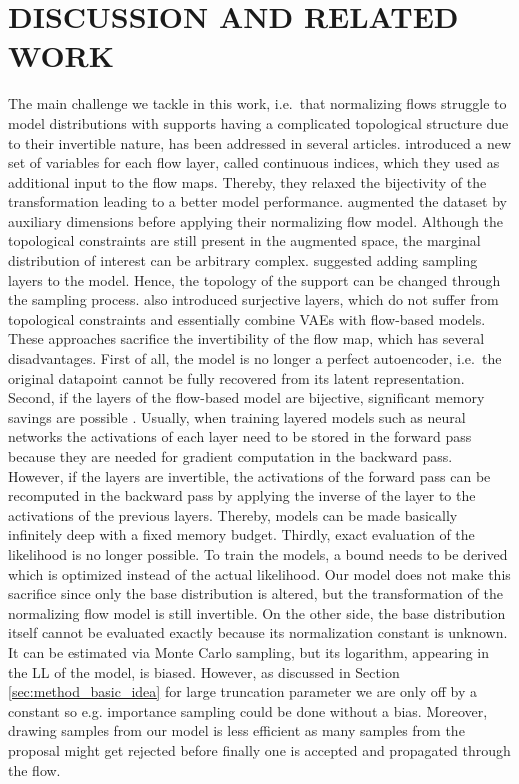\documentclass[twoside]{article}
\begin{document}
\section{DISCUSSION AND RELATED WORK}
\label{sec:discussion}

The main challenge we tackle in this work, i.e.\ that normalizing flows struggle to model distributions with supports having a complicated topological structure due to their invertible nature, has been addressed in several articles. \cite{Cornish2020} introduced a new set of variables for each flow layer, called continuous indices, which they used as additional input to the flow maps. Thereby, they relaxed the bijectivity of the transformation leading to a better model performance. \cite{Huang2020} augmented the dataset by auxiliary dimensions before applying their normalizing flow model. Although the topological constraints are still present in the augmented space, the marginal distribution of interest can be arbitrary complex. \cite{Wu2020,Nielsen2020} suggested adding sampling layers to the model. Hence, the topology of the support can be changed through the sampling process. \cite{Nielsen2020} also introduced surjective layers, which do not suffer from topological constraints and essentially combine VAEs with flow-based models. These approaches sacrifice the invertibility of the flow map, which has several disadvantages. First of all, the model is no longer a perfect autoencoder, i.e.\ the original datapoint cannot be fully recovered from its latent representation. Second, if the layers of the flow-based model are bijective, significant memory savings are possible \citep{Gomez2017}. Usually, when training layered models such as neural networks the activations of each layer need to be stored in the forward pass because they are needed for gradient computation in the backward pass. However, if the layers are invertible, the activations of the forward pass can be recomputed in the backward pass by applying the inverse of the layer to the activations of the previous layers. Thereby, models can be made basically infinitely deep  with a fixed memory budget. Thirdly, exact evaluation of the likelihood is no longer possible. To train the models, a bound needs to be derived which is optimized instead of the actual likelihood. Our model does not make this sacrifice since only the base distribution is altered, but the transformation of the normalizing flow model is still invertible. On the other side, the base distribution itself cannot be evaluated exactly because its normalization constant is unknown. It can be estimated via Monte Carlo sampling, but its logarithm, appearing in the LL of the model, is biased. However, as discussed in Section \ref{sec:method_basic_idea} for large truncation parameter  we are only off by a constant so e.g. importance sampling could be done without a bias. Moreover, drawing samples from our model is less efficient as many samples from the proposal might get rejected before finally one is accepted and propagated through the flow.
\end{document}
